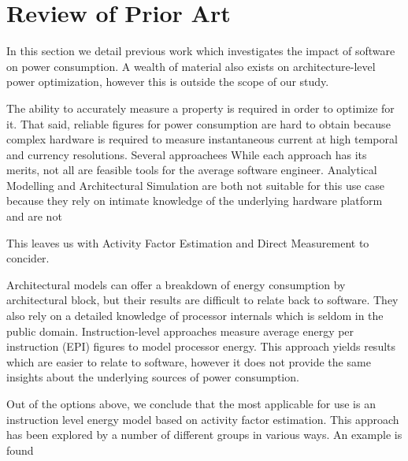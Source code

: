 \section{Review of Prior Art}
\label{sec:prior}

In this section we detail previous work which investigates the impact of software on power consumption. A wealth of material also exists on architecture-level power optimization, however this is outside the scope of our study.\golden

The ability to accurately measure a property is required in order to optimize for it. That said, reliable figures for power consumption are hard to obtain because complex hardware is required to measure instantaneous current at high temporal and currency resolutions. Several approachees  While each approach has its merits, not all are feasible tools for the average software engineer. Analytical Modelling and Architectural Simulation are both not suitable for this use case because they rely on intimate knowledge of the underlying hardware platform and are not 



This leaves us with Activity Factor Estimation and  Direct Measurement to concider.






Architectural models can offer a breakdown of energy consumption by architectural block, but their results are difficult to relate back to software. They also rely on a detailed knowledge of processor internals which is seldom in the public domain. Instruction-level approaches measure average energy per instruction (EPI) figures to model processor energy. This approach yields results which are easier to relate to software, however it does not provide the same insights about the underlying sources of power consumption.\golden


Out of the options above, we conclude that the most applicable for use is an instruction level energy model based on activity factor estimation. This approach has been explored by a number of different groups in various ways. An  example is found  







